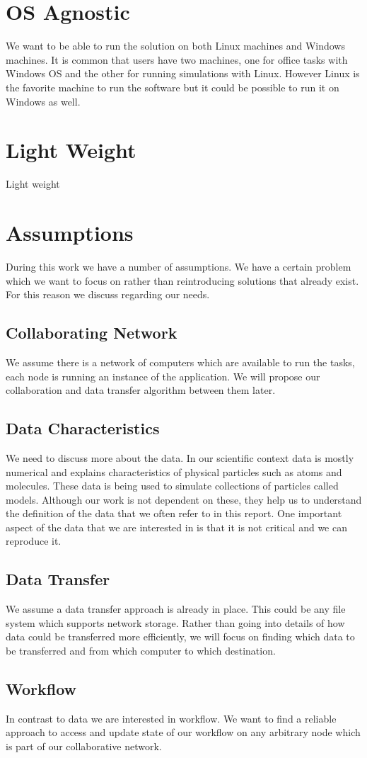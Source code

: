 \section{OS Agnostic}
We want to be able to run the solution on both Linux machines and Windows machines. It is common that users have
two machines, one for office tasks with Windows OS and the other for running simulations with Linux. However Linux
is the favorite machine to run the software but it could be possible to run it on Windows as well.

\section{Light Weight}
Light weight



\section{Assumptions}
During this work we have a number of assumptions. We have a certain problem which we want to focus
on rather than reintroducing solutions that already exist. For this reason we discuss regarding our 
needs.

\subsection{Collaborating Network}
We assume there is a network of computers which are available to run the tasks, each node is running an instance
of the application. We will propose our collaboration and data transfer algorithm between them later.

\subsection{Data Characteristics}
We need to discuss more about the data. In our scientific context data is mostly numerical and explains characteristics
of physical particles such as atoms and molecules. These data is being used to simulate collections of particles called
models. Although our work is not dependent on these, they help us to understand the definition of the data that
we often refer to in this report. One important aspect of the data that we are interested in is that it is not critical 
and we can reproduce it. 

\subsection{Data Transfer}
We assume a data transfer approach is already in place. This could be any file system which supports 
network storage. Rather than going into details of how data could be transferred more efficiently, we will
focus on finding which data to be transferred and from which computer to which destination.

\subsection{Workflow}
In contrast to data we are interested in workflow. We want to find a reliable approach to access and update 
state of our workflow on any arbitrary node which is part of our collaborative network.
